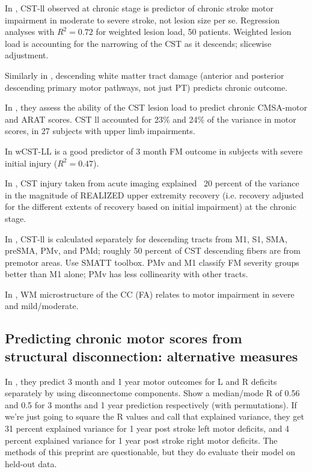 \documentclass[10pt]{article}
\begin{document}
In \cite{Zhu2010-qh}, CST-ll observed at chronic stage is predictor of chronic stroke motor impairment in moderate to severe stroke, not lesion size per se. Regression analyses with $R^2 = 0.72$ for weighted lesion load, 50 patients. Weighted lesion load is accounting for the narrowing of the CST as it descends; slicewise adjustment. 

Similarly in \cite{Lindenberg2010-pa}, descending white matter tract damage (anterior and posterior descending primary motor pathways, not just PT) predicts chronic outcome.

In \cite{Lam2018-xh}, they assess the ability of the CST lesion load to predict chronic CMSA-motor and ARAT scores. CST ll accounted for 23$\%$ and 24$\%$ of the variance in motor scores, in 27 subjects with upper limb impairments.

In \cite{Feng2015-du} wCST-LL is a good predictor of 3 month FM outcome in subjects with severe initial injury ($R^2 = 0.47$).

In \cite{Lin2019-hy}, CST injury taken from acute imaging explained ~20 percent of the variance in the magnitude of REALIZED upper extremity recovery (i.e. recovery adjusted for the different extents of recovery based on initial impairment) at the chronic stage.

In \cite{Ito2022-em}, CST-ll is calculated separately for descending tracts from M1, S1, SMA, preSMA, PMv, and PMd; roughly 50 percent of CST descending fibers are from premotor areas. Use SMATT toolbox. PMv and M1 classify FM severity groups better than M1 alone; PMv has less collinearity with other tracts.

In \cite{Hayward2022-hv}, WM microstructure of the CC (FA) relates to motor impairment in severe and mild/moderate. 

\subsection*{Predicting chronic motor scores from structural disconnection: alternative measures}
In \cite{Dulyan2021-jf}, they predict 3 month and 1 year motor outcomes for L and R deficits separately by using disconnectome components. Show a median/mode R of 0.56 and 0.5 for 3 months and 1 year prediction respectively (with permutations). If we're just going to square the R values and call that explained variance, they get 31 percent explained variance for 1 year post stroke left motor deficits, and 4 percent explained variance for 1 year post stroke right motor deficits. The methods of this preprint are questionable, but they do evaluate their model on held-out data.
\end{document}
